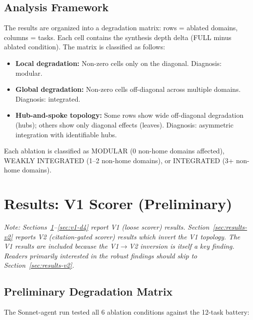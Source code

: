 \documentclass[12pt,letterpaper]{article}
\begin{document}
\subsection{Analysis Framework}

The results are organized into a degradation matrix: rows = ablated domains, columns = tasks. Each cell contains the synthesis depth delta (FULL minus ablated condition). The matrix is classified as follows:

\begin{itemize}[nosep]
  \item \textbf{Local degradation:} Non-zero cells only on the diagonal. Diagnosis: modular.
  \item \textbf{Global degradation:} Non-zero cells off-diagonal across multiple domains. Diagnosis: integrated.
  \item \textbf{Hub-and-spoke topology:} Some rows show wide off-diagonal degradation (hubs); others show only diagonal effects (leaves). Diagnosis: asymmetric integration with identifiable hubs.
\end{itemize}

Each ablation is classified as MODULAR (0 non-home domains affected), WEAKLY INTEGRATED (1--2 non-home domains), or INTEGRATED (3+ non-home domains).

\section{Results: V1 Scorer (Preliminary)}
\label{sec:results-v1}

\emph{Note: Sections~\ref{sec:results-v1}--\ref{sec:v1-d4} report V1 (loose scorer) results. Section~\ref{sec:results-v2} reports V2 (citation-gated scorer) results which invert the V1 topology. The V1 results are included because the V1$\to$V2 inversion is itself a key finding. Readers primarily interested in the robust findings should skip to Section~\ref{sec:results-v2}.}

\subsection{Preliminary Degradation Matrix}

The Sonnet-agent run tested all 6 ablation conditions against the 12-task battery:
\end{document}
